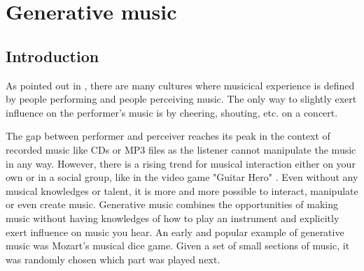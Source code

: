 	 \begin{acronym}[Soundgates]
	 \end{acronym}
	 

	\section{Generative music}
	

	\subsection{Introduction}
	As pointed out in \cite{Chandra2012}, there are many cultures where musicical experience is defined by people performing and people perceiving music. 
	The only way to slightly exert influence on the performer's music is by cheering, shouting, etc. on a concert. 
	
	The gap between performer and perceiver reaches its peak in the context of recorded music like CDs or MP3 files as the listener cannot manipulate the music in any way. 
	However, there is a rising trend for musical interaction either on your own or in a social group, like in the video game "Guitar Hero" \cite{Chandra2012, Planck2009}. 
	Even without any musical knowledges or talent, it is more and more possible to interact, manipulate or even create music.
	Generative music combines the opportunities of making music without having knowledges of how to play an instrument and explicitly exert influence on music you hear.
	An early and popular example of generative music was Mozart's musical dice game. Given a set of small sections of music, it was randomly chosen which part was played next.


